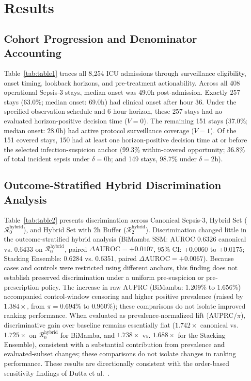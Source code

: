 \documentclass[10pt,twocolumn,a4paper]{article}
\begin{document}
\section{Results}

\subsection{Cohort Progression and Denominator Accounting}
Table~\ref{tab:table1} traces all 8,254 ICU admissions through surveillance eligibility, onset timing, lookback horizons, and pre-treatment actionability. Across all 408 operational Sepsis-3 stays, median onset was 49.0h post-admission. Exactly 257 stays (63.0\%; median onset: 69.0h) had clinical onset after hour 36. Under the specified observation schedule and 6-hour horizon, these 257 stays had no evaluated horizon-positive decision time ($V=0$). The remaining 151 stays (37.0\%; median onset: 28.0h) had active protocol surveillance coverage ($V=1$). Of the 151 covered stays, 150 had at least one horizon-positive decision time at or before the selected infection-suspicion anchor (99.3\% within-covered opportunity; 36.8\% of total incident sepsis under $\delta=0\mathrm{h}$; and 149 stays, 98.7\% under $\delta=2\mathrm{h}$).



\subsection{Outcome-Stratified Hybrid Discrimination Analysis}
Table~\ref{tab:table2} presents discrimination across Canonical Sepsis-3, Hybrid Set ($\mathcal{R}_0^{\mathrm{hybrid}}$), and Hybrid Set with 2h Buffer ($\mathcal{R}_2^{\mathrm{hybrid}}$). Discrimination changed little in the outcome-stratified hybrid analysis (BiMamba SSM: AUROC 0.6326 canonical vs. 0.6433 on $\mathcal{R}_0^{\mathrm{hybrid}}$, paired $\Delta\text{AUROC} = +0.0107$, 95\% CI: +0.0060 to +0.0175; Stacking Ensemble: 0.6284 vs. 0.6351, paired $\Delta\text{AUROC} = +0.0067$). Because cases and controls were restricted using different anchors, this finding does not establish preserved discrimination under a uniform pre-suspicion or pre-prescription policy. The increase in raw AUPRC (BiMamba: 1.209\% to 1.656\%) accompanied control-window censoring and higher positive prevalence (raised by $1.384\times$, from $\pi=0.694\%$ to $0.960\%$); these comparisons do not isolate improved ranking performance. When evaluated as prevalence-normalized lift ($\text{AUPRC}/\pi$), discriminative gain over baseline remains essentially flat ($1.742\times$ canonical vs. $1.725\times$ on $\mathcal{R}_0^{\mathrm{hybrid}}$ for BiMamba, and $1.738\times$ vs. $1.688\times$ for the Stacking Ensemble), consistent with a substantial contribution from prevalence and evaluated-subset changes; these comparisons do not isolate changes in ranking performance. These results are directionally consistent with the order-based sensitivity findings of Dutta et al.~\cite{dutta2026performance}.
\end{document}
